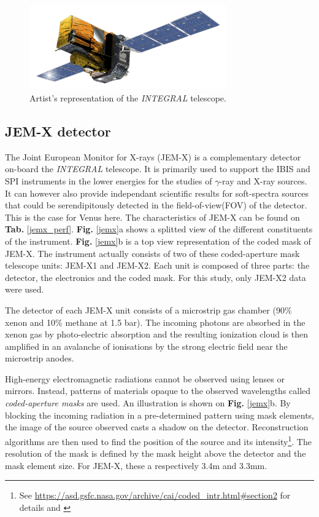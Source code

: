     \begin{figure}[H]
        \centering
        \includegraphics[width = 8.5cm]{report/Figures/intro/INTEGRAL_spacecraft_model.png}
        \caption{Artist's representation of the \textit{INTEGRAL} telescope.}
        \label{integral}
    \end{figure}
    
        \subsection{JEM-X detector}
        The Joint European Monitor for X-rays (JEM-X) is a complementary detector on-board the \textit{INTEGRAL} telescope. It is primarily used to support the IBIS and SPI instruments in the lower energies for the studies of $\gamma$-ray and X-ray sources. It can however also provide independant scientific results for soft-spectra sources that could be serendipitously detected in the field-of-view(FOV) of the detector. This is the case for Venus here.
        The characteristics of JEM-X can be found on \textbf{Tab.} \ref{jemx_perf}. \textbf{Fig.} \ref{jemx}a shows a splitted view of the different constituents of the instrument. \textbf{Fig.} \ref{jemx}b is a top view representation of the coded mask of JEM-X. The instrument actually consists of two of these coded-aperture mask telescope units: JEM-X1 and JEM-X2. Each unit is composed of three parts: the detector, the electronics and the coded mask. For this study, only JEM-X2 data were used.

        The detector of each JEM-X unit consists of a microstrip gas chamber (90\% xenon and 10\% methane at 1.5 bar). The incoming photons are absorbed in the xenon gas by photo-electric absorption and the resulting ionization cloud is then amplified in an avalanche of ionisations by the strong electric field near the microstrip anodes\cite{2020ISDCManual}.

        High-energy electromagnetic radiations cannot be observed using lenses or mirrors. Instead, patterns of materials opaque to the observed wavelengths called \textit{coded-aperture masks} are used. An illustration is shown on \textbf{Fig.} \ref{jemx}b. By blocking the incoming radiation in a pre-determined pattern using mask elements, the image of the source observed casts a shadow on the detector. Reconstruction algorithms are then used to find the position of the source and its intensity\footnote{See \url{https://asd.gsfc.nasa.gov/archive/cai/coded_intr.html\#section2} for details and \cite{Dicke1968SCATTER-HOLERAYS}}. The resolution of the mask is defined by the mask height above the detector and the mask element size. For JEM-X, these a respectively 3.4m and 3.3mm\cite{2020ISDCManual}.

